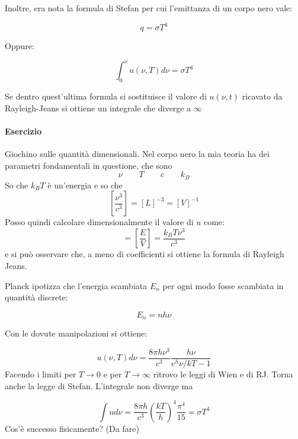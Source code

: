 \documentclass[11pt,a4paper]{article}
\begin{document}
Inoltre, era nota la formula di Stefan per cui l'emittanza di un corpo nero vale:

\begin{equation}
q = \sigma T^4
\end{equation}

Oppure:

\begin{equation}
\int_{0}^{\nu}u(\nu,T) d\nu = \sigma T^4
\end{equation}


Se dentro quest'ultima formula si sostituisce il valore di $ u(\nu,t) $ ricavato da Rayleigh-Jeans si ottiene un integrale che diverge a $ \infty $

\paragraph{Esercizio}

Giochino sulle quantità dimensionali. Nel corpo nero la mia teoria ha dei parametri fondamentali in questione, che sono
\begin{equation}
\nu \qquad T \qquad c \qquad k_B
\end{equation}
So che $ k_B T $ è un'energia e so che
\begin{equation}
\left[ \frac{\nu^3}{c^3} \right] = [L]^{-3} = [V]^{-1}
\end{equation}
Posso quindi calcolare dimensionalmente il valore di $ u $ come:
\begin{equation}
[u] = \left[ \frac{E}{V} \right]  = \frac{k_B T \nu^3}{c^3}
\end{equation}
e si può osservare che, a meno di coefficienti si ottiene la formula di Rayleigh Jeans.

Planck ipotizza che l'energia scambiata $ E_n $ per ogni modo fosse scambiata in quantità discrete:

\begin{equation}
E_n = nh\nu
\end{equation}

Con le dovute manipolazioni si ottiene:

\begin{equation}
u(\nu,T)d\nu = \frac{8\pi h \nu^3}{c^3} \frac{h\nu}{{e^h\nu/kT}-1}
\end{equation} 
Facendo i limiti per $ T \rightarrow 0 $ e per $ T \rightarrow \infty $ ritrovo le leggi di Wien e di RJ.
Torna anche la legge di Stefan. L'integrale non diverge ma

\begin{equation}
\int u d\nu = \frac{8\pi h}{c^3} \left(\frac{kT}{h}\right)^4 \frac{\pi^4}{15} = \sigma T^4
\end{equation}
Cos'è successo fisicamente?
(Da fare)
\end{document}
